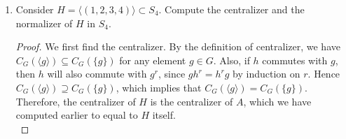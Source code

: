\documentclass{article}
\begin{document}
\begin{enumerate}
\begin{enumerate}
\begin{proof}
          Next, we check commutativity with the 4-cycles. Clearly
          $(1,2,3,4)$ commutes with itself and hence with any 4-cycle in
          its cyclic subgroup. We check that $(1,2,3,4)$ does not commute
          with $(1,2,4,3)$, $(1,3,4,2)$, $(1,3,2,4)$, $(1,4,2,3)$, or
          $(1,4,3,2)$. Any other 4-cycle not in $\langle A\rangle$
          generates a cyclic subgroup that contains one of these
          non-commutating elements, so the only 4-cycles that commute with
          $(1,2,3,4)$ are those in its cyclic subgroup. Finally, we check
          for commutativity with the disjoint 2-cycles. We check that
          $(1,2,3,4)$ does not commute with $(1,2)(3,4)$, $(1,3)(2,4)$,
          or $(1,4)(2,3)$, which are all the possible disjoint 2-cycles. We
          conclude that the centralizer of $A$, which is also its
          normalizer, is the its cyclic subgroup, which is
          $\langle(1,2,3,4)\rangle$. \\
        \end{proof}

      \item Consider $H=\langle(1,2,3,4)\rangle\subset S_4$. Compute the
        centralizer and the normalizer of $H$ in $S_4$.

        \begin{proof}
          We first find the centralizer. By the definition of centralizer,
          we have $C_G(\langle g\rangle)\subseteq C_G(\{g\})$ for any
          element $g\in G$. Also, if $h$ commutes with $g$, then $h$ will
          also commute with $g^r$, since $gh^r=h^rg$ by induction on $r$.
          Hence $C_G(\langle g\rangle)\supseteq C_G(\{g\})$, which implies
          that $C_G(\langle g\rangle)=C_G(\{g\})$. Therefore, the
          centralizer of $H$ is the centralizer of $A$, which we have
          computed earlier to equal to $H$ itself. \\


\end{proof}
\end{enumerate}
\end{enumerate}
\end{document}
